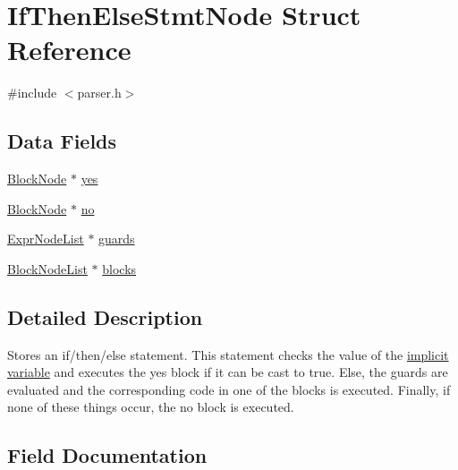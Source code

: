 \hypertarget{struct_if_then_else_stmt_node}{}\section{If\+Then\+Else\+Stmt\+Node Struct Reference}
\label{struct_if_then_else_stmt_node}


{\ttfamily \#include $<$parser.\+h$>$}

\subsection*{Data Fields}
\begin{DoxyCompactItemize}
\item 
\hyperlink{struct_block_node}{Block\+Node} $\ast$ \hyperlink{struct_if_then_else_stmt_node_ae28470757cf61cab67dd9096114f4710}{yes}
\item 
\hyperlink{struct_block_node}{Block\+Node} $\ast$ \hyperlink{struct_if_then_else_stmt_node_aeb7d6e0fb8dad0d6e894bcdc887306fe}{no}
\item 
\hyperlink{struct_expr_node_list}{Expr\+Node\+List} $\ast$ \hyperlink{struct_if_then_else_stmt_node_ad94295fb6d16e9815a85e0d8e930f079}{guards}
\item 
\hyperlink{struct_block_node_list}{Block\+Node\+List} $\ast$ \hyperlink{struct_if_then_else_stmt_node_ab4b9831a1e7db13c206997a45ee84a95}{blocks}
\end{DoxyCompactItemize}


\subsection{Detailed Description}
Stores an if/then/else statement. This statement checks the value of the \hyperlink{impvar}{implicit variable} and executes the {\ttfamily yes} block if it can be cast to true. Else, the {\ttfamily guards} are evaluated and the corresponding code in one of the {\ttfamily blocks} is executed. Finally, if none of these things occur, the {\ttfamily no} block is executed. 

\subsection{Field Documentation}
\mbox{\label{struct_if_then_else_stmt_node_ae28470757cf61cab67dd9096114f4710}} 

